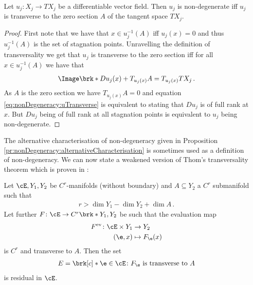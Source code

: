 \begin{proposition}\label{pr:nonDegeneracy:alternativeCharacterisation}
  Let $u_j\colon X_j\to TX_j$ be a differentiable vector field.
  Then $u_j$ is non-degenerate iff $u_j$ is transverse to the zero section $A$ of the tangent space $TX_j$.
\end{proposition}
\begin{proof}
  First note that we have that $x\in u_j^{-1}(A)$ iff $u_j(x)=0$ and thus $u_j^{-1}(A)$ is the set of stagnation points.
  Unravelling the definition of transversality we get that $u_j$ is transverse to the zero section iff for all $x\in u_j^{-1}(A)$
  we have that
  \begin{align}
    \Image\brk*{Du_j(x)}+T_{u_j(x)}A = T_{u_j(x)}TX_j\,. \label{eq:nonDegeneracy:uTransverse}
  \end{align}
  As $A$ is the zero section we have $T_{u_j(x)}A=0$ and equation \eqref{eq:nonDegeneracy:uTransverse}
  is equivalent to stating that $Du_j$ is of full rank at $x$. But $Du_j$ being of full rank at all stagnation points
  is equivalent to $u_j$ being non-degenerate.
\end{proof}
The alternative characterisation of non-degeneracy given in Proposition \ref{pr:nonDegeneracy:alternativeCharacterisation}
is sometimes used as a definition of non-degeneracy.
We can now state a weakened version of Thom's transversality theorem which is proven in \cite[§3 Theorem 2.7]{Hirsch1994}:
\begin{theorem}
  Let $\cE,Y_1,Y_2$ be $C^r$-manifolds (without boundary) and $A\subseteq Y_2$ a $C^r$ submanifold such that
  \begin{align*}
    r>\dim Y_1-\dim Y_2+\dim A\,.
  \end{align*}
  Let further $F\colon \cE\to C^r\brk*{Y_1,Y_2}$ be such that the evaluation map
  \begin{align*}
    F^\text{ev}\colon \cE\times Y_1&\to Y_2 \\
    (\e,x)&\mapsto F_\e(x)
  \end{align*}
  is $C^r$ and transverse to $A$.
  Then the set
  \begin{align*}
    E=\brk[c]*{\e\in \cE\colon F_\e\text{ is transverse to } A}
  \end{align*}
  is residual in $\cE$.
\end{theorem}

